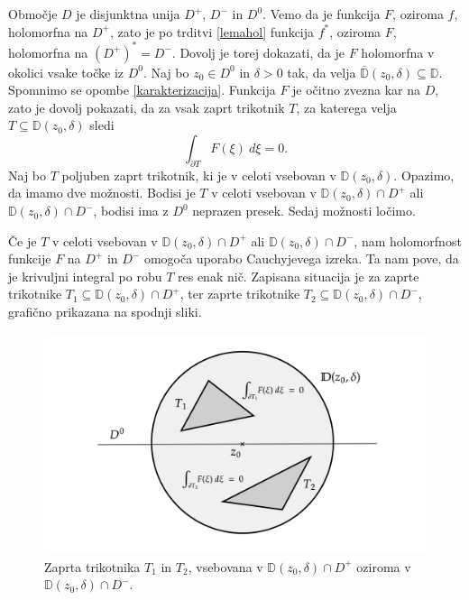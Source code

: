 \documentclass[mat1, tisk]{fmfdelo}
\begin{document}
    \begin{dokaz}
        Območje $D$ je disjunktna unija $D^+$, $D^-$ in $D^0$. Vemo da je funkcija $F$, oziroma $f$, holomorfna na $D^+$, zato je po trditvi \ref{lemahol} funkcija $f^*$, oziroma $F$, holomorfna na $(D^+)^* = D^-$. 
        Dovolj je torej dokazati, da je $F$ holomorfna v okolici vsake točke iz $D^0$. 
        Naj bo $z_0 \in D^0$ in $\delta > 0$ tak, da velja $\overline{\mathbb{D}}(z_0,\delta) \subseteq \mathbb{D}$. Spomnimo se opombe \ref{karakterizacija}. 
        Funkcija $F$ je očitno zvezna kar na $D$, zato je dovolj pokazati, da za vsak zaprt trikotnik $T$, za katerega velja $T \subseteq \mathbb{D}(z_0, \delta)$ sledi
        $$ 
            \int_{\partial T}{F(\xi)~d\xi} = 0.
        $$
        Naj bo $T$ poljuben zaprt trikotnik, ki je v celoti vsebovan v $\mathbb{D}(z_0,\delta)$. Opazimo, da imamo dve možnosti.
        Bodisi je $T$ v celoti vsebovan v $\mathbb{D}(z_0,\delta) \cap D^+$ ali $\mathbb{D}(z_0,\delta) \cap D^-$, bodisi ima z $D^0$ neprazen presek. Sedaj možnosti ločimo.
        
        Če je $T$ v celoti vsebovan v $\mathbb{D}(z_0,\delta) \cap D^+$ ali $\mathbb{D}(z_0,\delta) \cap D^-$, nam holomorfnost funkcije $F$ na $D^+$ in $D^-$ omogoča uporabo Cauchyjevega izreka. 
        Ta nam pove, da je krivuljni integral po robu $T$ res enak nič. 
        Zapisana situacija je za zaprte trikotnike $T_1 \subseteq \mathbb{D}(z_0,\delta) \cap D^+$, ter zaprte trikotnike $T_2 \subseteq \mathbb{D}(z_0,\delta) \cap D^-$, grafično prikazana na spodnji sliki. 
        \begin{figure}[H]
            \begin{center}
                \includegraphics[width = 0.9 \textwidth]{schwarz_hol_1.png}
                \caption{Zaprta trikotnika $T_1$ in $T_2$, vsebovana v $\mathbb{D}(z_0,\delta) \cap D^+$ oziroma v $\mathbb{D}(z_0,\delta) \cap D^-$.}
            \end{center}    
        \end{figure}


\end{dokaz}
\end{document}
